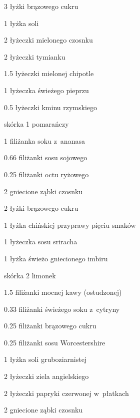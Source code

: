 \documentclass[../kucharek.tex]{subfiles}
\begin{document}

\begin{Ingred}
    \item \num{3} łyżki brązowego cukru
    \item \num{1} łyżka soli
    \item \num{2} łyżeczki mielonego czosnku
    \item \num{2} łyżeczki tymianku
    \item \num{1.5} łyżeczki mielonej chipotle
    \item \num{1} łyżeczka świeżego pieprzu
    \item \num{.5} łyżeczki kminu rzymskiego
    \item skórka \num{1} pomarańczy
\end{Ingred}


\begin{Ingred}
    \item \num{1} filiżanka soku z~ananasa
    \item \num{.66} filiżanki sosu sojowego
    \item \num{.25} filiżanki octu ryżowego
    \item \num{2} gniecione ząbki czosnku
    \item \num{2} łyżki brązowego cukru
    \item \num{1} łyżka chińskiej przyprawy pięciu smaków
    \item \num{1} łyżeczka sosu sriracha
    \item \num{1} łyżka świeżo gniecionego imbiru
    \item skórka \num{2} limonek
\end{Ingred}


\begin{Ingred}
    \item \num{1.5} filiżanki mocnej kawy (ostudzonej)
    \item \num{.33} filiżanki świeżego soku z~cytryny
    \item \num{.25} filiżanki brązowego cukru
    \item \num{.25} filiżanki sosu Worcestershire
    \item \num{1} łyżka soli gruboziarnistej
    \item \num{2} łyżeczki ziela angielskiego
    \item \num{2} łyżeczki papryki czerwonej w~płatkach
    \item \num{2} gniecione ząbki czosnku
\end{Ingred}
\end{document}
